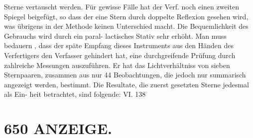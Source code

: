 \documentclass[12pt,a4paper]{article}
\begin{document}
{{{{{{{{Sterne  vertauscht  werden.  Für  gewisse  Fälle  hat  der  Verf.  noch  einen zweiten  Spiegel  beigefügt,  so  dass  der  eine  Stern  durch  doppelte  Reflexion  gesehen  wird,  was  übrigens in  der  Methode  keinen  Unterschied  macht.  Die  Bequemlichkeit  des  Gebrauchs  wird  durch  ein  paral- lactisches  Stativ  sehr  erhöht. Man  muss  bedauern ,  dass  der  späte  Empfang  dieses  Instruments  aus  den  Händen  des  Verfertigers den  Verfasser  gehindert  hat,  eine  durchgreifende  Prüfung  durch  zahlreiche  Messungen  auszuführen.  Er hat  das  Lichtverhältniss  von  sieben  Sternpaaren,  zusammen  aus  nur  44  Beobachtungen,  die  jedoch  nur summarisch  angezeigt  werden,  bestimmt.  Die  Resultate,  die  zuerst  gesetzten  Sterne  jedesmal  als  Ein- heit betrachtet,  sind  folgende: VI.  138


\section*{650  ANZEIGE.}

}}}}}}}}
\end{document}
